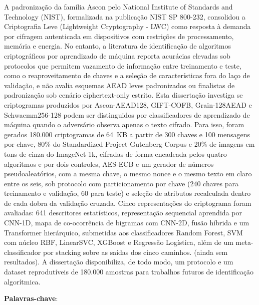 \setlength{\absparsep}{18pt} %
\begin{resumo}
\SingleSpacing
A padronização da família Ascon pelo National Institute of Standards and Technology (NIST), formalizada na publicação NIST SP 800-232, consolidou a Criptografia Leve (Lightweight Cryptography - LWC) como resposta à demanda por cifragem autenticada em dispositivos com restrições de processamento, memória e energia. No entanto, a literatura de identificação de algoritmos criptográficos por aprendizado de máquina reporta acurácias elevadas sob protocolos que permitem vazamento de informação entre treinamento e teste, como o reaproveitamento de chaves e a seleção de características fora do laço de validação, e não avalia esquemas AEAD leves padronizados ou finalistas de padronização sob cenário ciphertext-only estrito. Esta dissertação investiga se criptogramas produzidos por Ascon-AEAD128, GIFT-COFB, Grain-128AEAD e Schwaemm256-128 podem ser distinguidos por classificadores de aprendizado de máquina quando o adversário observa apenas o texto cifrado. Para isso, foram gerados 180.000 criptogramas de 64~KB a partir de 300 chaves e 100 mensagens por chave, 80\% do Standardized Project Gutenberg Corpus e 20\% de imagens em tons de cinza do ImageNet-1k, cifradas de forma encadeada pelos quatro algoritmos e por dois controles, AES-ECB e um gerador de números pseudoaleatórios, com a mesma chave, o mesmo nonce e o mesmo texto em claro entre os seis, sob protocolo com particionamento por chave (240 chaves para treinamento e validação, 60 para teste) e seleção de atributos recalculada dentro de cada dobra da validação cruzada. Cinco representações do criptograma foram avaliadas: 641 descritores estatísticos, representação sequencial aprendida por CNN-1D, mapa de co-ocorrência de bigramas com CNN-2D, fusão híbrida e um Transformer hierárquico, submetidas aos classificadores Random Forest, SVM com núcleo RBF, LinearSVC, XGBoost e Regressão Logística, além de um meta-classificador por stacking sobre as saídas dos cinco caminhos. (ainda sem resultados). A dissertação disponibiliza, de todo modo, um protocolo e um dataset reprodutíveis de 180.000 amostras para trabalhos futuros de identificação algorítmica.

 \textbf{Palavras-chave}: \imprimirpalavraschave
\end{resumo}

